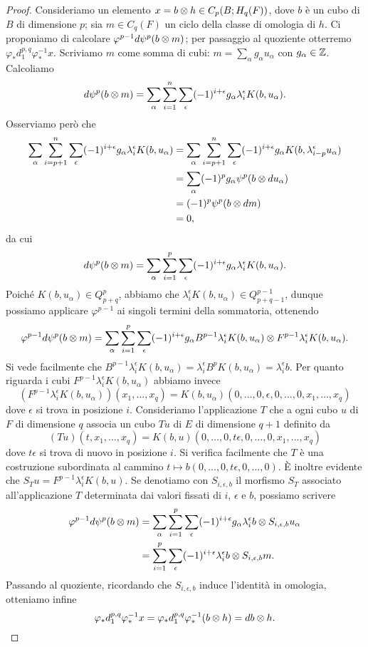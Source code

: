 \begin{proof}
Consideriamo un elemento \(x=b\mathbin{\otimes} h\in C_p(B;H_q(F))\), dove \(b\) è un cubo di \(B\) di dimensione \(p\); sia \(m\in C_q(F)\) un ciclo della classe di omologia di \(h\). Ci proponiamo di calcolare \(\varphi^{p-1}d\psi^p(b\mathbin{\otimes} m)\); per passaggio al quoziente otterremo \(\varphi_*d^{p,q}_1\varphi_*^{-1}x\). Scriviamo \(m\) come somma di cubi: \(m=\sum_{\alpha}g_\alpha u_\alpha\) con \(g_\alpha\in\mathbb{Z}\). Calcoliamo
\[
d\psi^p(b\mathbin{\otimes} m)=\sum_\alpha\sum_{i=1}^n\sum_\epsilon(-1)^{i+\epsilon}g_\alpha\lambda^\epsilon_iK(b,u_\alpha).
\]
Osserviamo però che
\begin{align*}
\sum_\alpha\sum_{i=p+1}^n\sum_\epsilon(-1)^{i+\epsilon}g_\alpha\lambda^\epsilon_iK(b,u_\alpha)&=\sum_{\alpha}\sum_{i=p+1}^n\sum_\epsilon(-1)^{i+\epsilon}g_\alpha K(b,\lambda^\epsilon_{i-p}u_\alpha)\\
&=\sum_\alpha(-1)^pg_\alpha\psi^p(b\mathbin{\otimes} du_\alpha)\\
&=(-1)^p\psi^p(b\mathbin{\otimes} dm)\\
&=0,
\end{align*}
da cui
\[
d\psi^p(b\mathbin{\otimes} m)=\sum_\alpha\sum_{i=1}^p\sum_\epsilon(-1)^{i+\epsilon}g_\alpha\lambda^\epsilon_iK(b,u_\alpha).
\]
Poiché \(K(b,u_\alpha)\in Q^p_{p+q}\), abbiamo che \(\lambda^\epsilon_iK(b,u_\alpha)\in Q^{p-1}_{p+q-1}\), dunque possiamo applicare \(\varphi^{p-1}\) ai singoli termini della sommatoria, ottenendo
\[
\varphi^{p-1}d\psi^p(b\mathbin{\otimes} m)=\sum_\alpha\sum_{i=1}^p\sum_\epsilon(-1)^{i+\epsilon}g_\alpha B^{p-1}\lambda^\epsilon_iK(b,u_\alpha)\mathbin{\otimes} F^{p-1}\lambda^\epsilon_iK(b,u_\alpha).
\]
Si vede facilmente che \(B^{p-1}\lambda^{\epsilon}_iK(b,u_\alpha)=\lambda^\epsilon_i B^pK(b,u_\alpha)=\lambda^\epsilon_ib\). Per quanto riguarda i cubi \(F^{p-1}\lambda^\epsilon_iK(b,u_\alpha)\) abbiamo invece
\[
(F^{p-1}\lambda^\epsilon_iK(b,u_\alpha))(x_1,\ldots,x_q)=K(b,u_\alpha)(0,\ldots,0,\epsilon,0,\ldots,0,x_1,\ldots,x_q)
\]
dove \(\epsilon\) si trova in posizione \(i\). Consideriamo l'applicazione \(T\) che a ogni cubo \(u\) di \(F\) di dimensione \(q\) associa un cubo \(Tu\) di \(E\) di dimensione \(q+1\) definito da
\[
(Tu)(t,x_1,\ldots,x_q)=K(b,u)(0,\ldots,0,t\epsilon,0,\ldots,0,x_1,\ldots,x_q)
\]
dove \(t\epsilon\) si trova di nuovo in posizione \(i\). Si verifica facilmente che \(T\) è una costruzione subordinata al cammino \(t\mapsto b(0,\ldots,0,t\epsilon,0,\ldots,0)\). È inoltre evidente che \(S_Tu=F^{p-1}\lambda^\epsilon_iK(b,u)\). Se denotiamo con \(S_{i,\epsilon,b}\) il morfismo \(S_T\) associato all'applicazione \(T\) determinata dai valori fissati di \(i\), \(\epsilon\) e \(b\), possiamo scrivere
\begin{align*}
\varphi^{p-1}d\psi^p(b\mathbin{\otimes} m)&=\sum_\alpha\sum_{i=1}^p\sum_\epsilon(-1)^{i+\epsilon}g_\alpha\lambda^\epsilon_ib\mathbin{\otimes} S_{i,\epsilon,b}u_\alpha\\
&=\sum_{i=1}^p\sum_\epsilon(-1)^{i+\epsilon}\lambda^\epsilon_ib\mathbin{\otimes} S_{i,\epsilon,b}m.
\end{align*}
Passando al quoziente, ricordando che \(S_{i,\epsilon, b}\) induce l'identità in omologia, otteniamo infine
\[
\varphi_*d^{p,q}_1\varphi_*^{-1}x=\varphi_*d^{p,q}_1\varphi_*^{-1}(b\mathbin{\otimes} h)=db\mathbin{\otimes} h.\qedhere
\]
\end{proof}
